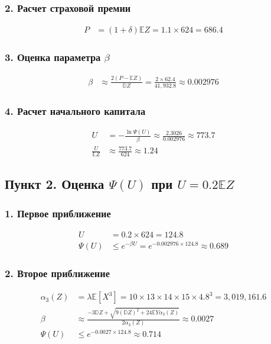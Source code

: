 \documentclass[12pt]{article}
\begin{document}
	\subsubsection*{2. Расчет страховой премии}
	\begin{align*}
		P &= (1+\delta)\mathbb{E}Z = 1.1 \times 624 = 686.4
	\end{align*}
	
	\subsubsection*{3. Оценка параметра $\beta$}
	\begin{align*}
		\beta &\approx \frac{2(P-\mathbb{E}Z)}{\mathbb{D}Z} = \frac{2 \times 62.4}{41,\!932.8} \approx 0.002976
	\end{align*}
	
	\subsubsection*{4. Расчет начального капитала}
	\begin{align*}
		U &= -\frac{\ln \Psi(U)}{\beta} \approx \frac{2.3026}{0.002976} \approx 773.7 \\
		\frac{U}{\mathbb{E}Z} &\approx \frac{773.7}{624} \approx 1.24
	\end{align*}
	
	\subsection*{Пункт 2. Оценка $\Psi(U)$ при $U = 0.2\mathbb{E}Z$}
	
	\subsubsection*{1. Первое приближение}
	\begin{align*}
		U &= 0.2 \times 624 = 124.8 \\
		\Psi(U) &\leq e^{-\beta U} = e^{-0.002976 \times 124.8} \approx 0.689
	\end{align*}
	
	\subsubsection*{2. Второе приближение}
	\begin{align*}
		\alpha_3(Z) &= \lambda \mathbb{E}[X^3] = 10 \times 13 \times 14 \times 15 \times 4.8^3 = 3,\!019,\!161.6 \\
		\beta &\approx \frac{-3\mathbb{D}Z + \sqrt{9(\mathbb{D}Z)^2 + 24\mathbb{E}Y\alpha_3(Z)}}{2\alpha_3(Z)} \approx 0.0027 \\
		\Psi(U) &\leq e^{-0.0027 \times 124.8} \approx 0.714
	\end{align*}
	
\end{document}
